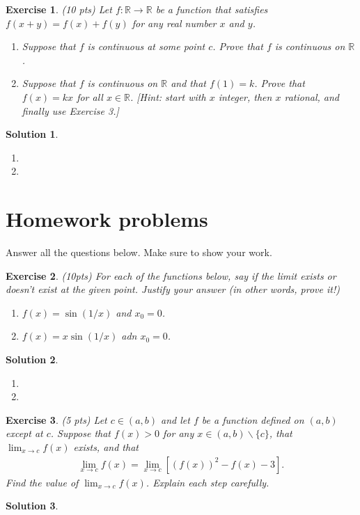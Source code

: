 \documentclass[12pt]{article}
\newcommand{\bR}{\mathbb{R}}
\newcommand{\oc}{\left[}
\newcommand{\fc}{\right]}
\newcommand{\ra}{\rightarrow}
\theoremstyle{plain}
\newtheorem{exer}{\textbf{Exercise}}}
\theoremstyle{plain}
\newtheorem*{sol}{\textbf{Solution}}}
\begin{document}
\begin{exer}
(10 pts)
Let $f : \bR \ra \bR$ be a function that satisfies $f(x + y) = f(x) + f(y)$ for any real number $x$ and $y$.
	\begin{enumerate}[label=\textbf{\alph*)}]
	\item Suppose that $f$ is continuous at some point $c$. Prove that $f$ is continuous on $\bR$.
	\item Suppose that $f$ is continuous on $\bR$ and that $f(1) = k$. Prove that $f(x) = kx$ for all $x \in \bR$. [Hint: start with $x$ integer, then $x$ rational, and finally use Exercise 3.]
	\end{enumerate}
\end{exer}
\begin{sol}
\begin{enumerate}[label=\textbf{\alph*)}]
\item 
\item 
\end{enumerate}
\end{sol}



\section{Homework problems}
Answer all the questions below. Make sure to show your work.

\begin{exer}
(10pts)
For each of the functions below, say if the limit exists or doesn't exist at the given point. Justify your answer (in other words, prove it!)
	\begin{enumerate}[label=\textbf{\alph*)}]
	\item $f(x) = \sin (1/x)$ and $x_0 = 0$.
	\item $f(x) = x \sin (1/x)$ adn $x_0 = 0$.
	\end{enumerate}
\end{exer}
\begin{sol}
\begin{enumerate}[label=\textbf{\alph*)}]
\item 
\item 
\end{enumerate}
\end{sol}

\begin{exer}
(5 pts)
Let $c \in (a, b)$ and let $f$ be a function defined on $(a, b)$ except at $c$. Suppose that $f(x) > 0$ for any $x \in (a, b) \backslash \{ c \}$, that $\lim_{x \ra c} f(x)$ exists, and that
	\begin{align*}
	\lim_{x \ra c} f(x) = \lim_{x \ra c} \oc (f(x))^2 - f(x) - 3 \fc .
	\end{align*} 
Find the value of $\lim_{x \ra c} f(x)$. Explain each step carefully.
\end{exer}
\begin{sol}

\end{sol}
\end{document}
